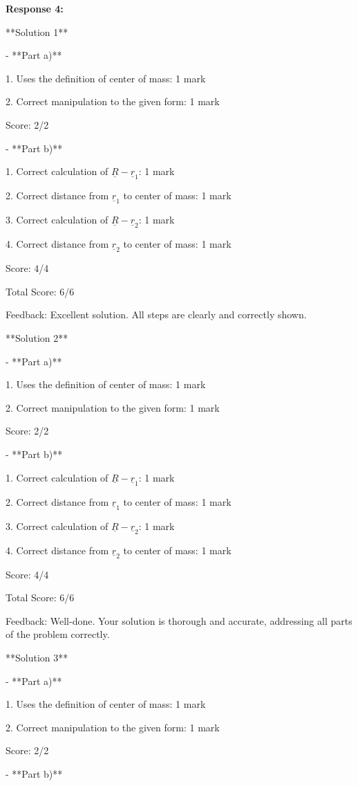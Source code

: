 \documentclass[a4paper,11pt]{article}
\begin{document}
\bigskip
\textbf{Response 4:}

**Solution 1**

- **Part a)**

1. Uses the definition of center of mass: 1 mark

2. Correct manipulation to the given form: 1 mark

Score: 2/2

- **Part b)**

1. Correct calculation of \(\underline{R} - \underline{r}_1\): 1 mark

2. Correct distance from \(\underline{r}_1\) to center of mass: 1 mark

3. Correct calculation of \(\underline{R} - \underline{r}_2\): 1 mark

4. Correct distance from \(\underline{r}_2\) to center of mass: 1 mark

Score: 4/4

Total Score: 6/6

Feedback: Excellent solution. All steps are clearly and correctly shown.

**Solution 2**

- **Part a)**

1. Uses the definition of center of mass: 1 mark

2. Correct manipulation to the given form: 1 mark

Score: 2/2

- **Part b)**

1. Correct calculation of \(\underline{R} - \underline{r}_1\): 1 mark

2. Correct distance from \(\underline{r}_1\) to center of mass: 1 mark

3. Correct calculation of \(\underline{R} - \underline{r}_2\): 1 mark

4. Correct distance from \(\underline{r}_2\) to center of mass: 1 mark

Score: 4/4

Total Score: 6/6

Feedback: Well-done. Your solution is thorough and accurate, addressing all parts of the problem correctly.

**Solution 3**

- **Part a)**

1. Uses the definition of center of mass: 1 mark

2. Correct manipulation to the given form: 1 mark

Score: 2/2

- **Part b)**
\end{document}
